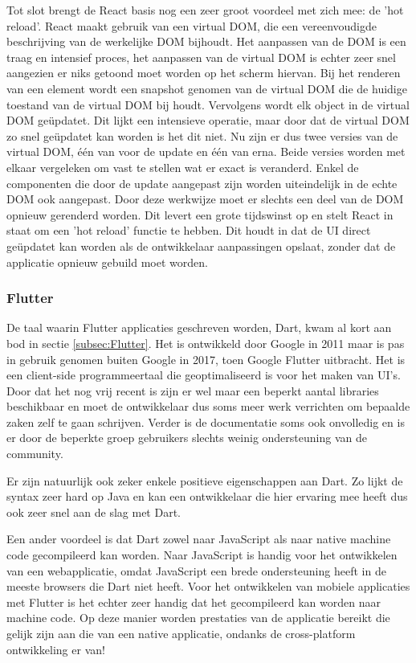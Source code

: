 Tot slot brengt de React basis nog een zeer groot voordeel met zich mee: de 'hot reload'. React maakt gebruik van een virtual DOM, die een vereenvoudigde beschrijving van de werkelijke DOM bijhoudt. Het aanpassen van de DOM is een traag en intensief proces, het aanpassen van de virtual DOM is echter zeer snel aangezien er niks getoond moet worden op het scherm hiervan. Bij het renderen van een element wordt een snapshot genomen van de virtual DOM die de huidige toestand van de virtual DOM bij houdt. Vervolgens wordt elk object in de virtual DOM geüpdatet. Dit lijkt een intensieve operatie, maar door dat de virtual DOM zo snel geüpdatet kan worden is het dit niet. Nu zijn er dus twee versies van de virtual DOM, één van voor de update en één van erna. Beide versies worden met elkaar vergeleken om vast te stellen wat er exact is veranderd. Enkel de componenten die door de update aangepast zijn worden uiteindelijk in de echte DOM ook aangepast. Door deze werkwijze moet er slechts een deel van de DOM opnieuw gerenderd worden. Dit levert een grote tijdswinst op en stelt React in staat om een 'hot reload' functie te hebben. Dit houdt in dat de UI direct geüpdatet kan worden als de ontwikkelaar aanpassingen opslaat, zonder dat de applicatie opnieuw gebuild moet worden.

\subsubsection{Flutter}
\label{subsubsec:taalFlutter}

De taal waarin Flutter applicaties geschreven worden, Dart, kwam al kort aan bod in sectie \ref{subsec:Flutter}. Het is ontwikkeld door Google in 2011 maar is pas in gebruik genomen buiten Google in 2017, toen Google Flutter uitbracht. Het is een client-side programmeertaal die geoptimaliseerd is voor het maken van UI's. Door dat het nog vrij recent is zijn er wel maar een beperkt aantal libraries beschikbaar en moet de ontwikkelaar dus soms meer werk verrichten om bepaalde zaken zelf te gaan schrijven. Verder is de documentatie soms ook onvolledig en is er door de beperkte groep gebruikers slechts weinig ondersteuning van de community.

Er zijn natuurlijk ook zeker enkele positieve eigenschappen aan Dart. Zo lijkt de syntax zeer hard op Java en kan een ontwikkelaar die hier ervaring mee heeft dus ook zeer snel aan de slag met Dart. 

Een ander voordeel is dat Dart zowel naar JavaScript als naar native machine code gecompileerd kan worden. Naar JavaScript is handig voor het ontwikkelen van een webapplicatie, omdat JavaScript een brede ondersteuning heeft in de meeste browsers die Dart niet heeft. Voor het ontwikkelen van mobiele applicaties met Flutter is het echter zeer handig dat het gecompileerd kan worden naar machine code. Op deze manier worden prestaties van de applicatie bereikt die gelijk zijn aan die van een native applicatie, ondanks de cross-platform ontwikkeling er van!

